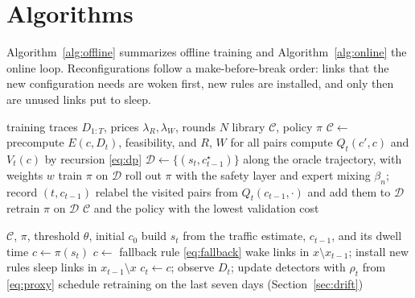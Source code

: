 \documentclass[journal]{IEEEtran}
\begin{document}
\section{Algorithms}\label{sec:algorithms}

Algorithm~\ref{alg:offline} summarizes offline training and Algorithm~\ref{alg:online} the online loop. Reconfigurations follow a make-before-break order: links that the new configuration needs are woken first, new rules are installed, and only then are unused links put to sleep.

\begin{algorithm}[t]
\caption{LiRA Offline Training}
\label{alg:offline}
\footnotesize
\begin{algorithmic}[1]
\Require training traces $D_{1:T}$, prices $\lambda_R,\lambda_W$, rounds $N$
\Ensure library $\mathcal{C}$, policy $\pi$
\State $\mathcal{C}\gets$  
\State precompute $E(c,D_t)$, feasibility, and $R$, $W$ for all pairs
\State compute $Q_t(c',c)$ and $V_t(c)$ by recursion \eqref{eq:dp}
\State $\mathcal{D}\gets\{(s_t,c^\star_{t-1})\}$ along the oracle trajectory, with weights $w$
\State train $\pi$ on $\mathcal{D}$
\State roll out $\pi$ with the safety layer and expert mixing $\beta_n$; record $(t,c_{t-1})$
\State relabel the visited pairs from $Q_t(c_{t-1},\cdot)$ and add them to $\mathcal{D}$
\State retrain $\pi$ on $\mathcal{D}$
\EndFor
\State \Return $\mathcal{C}$ and the policy with the lowest validation cost
\end{algorithmic}
\end{algorithm}

\begin{algorithm}[t]
\caption{LiRA Online Control Loop}
\label{alg:online}
\footnotesize
\begin{algorithmic}[1]
\Require $\mathcal{C}$, $\pi$, threshold $\theta$, initial $c_0$
\State build $s_t$ from the traffic estimate, $c_{t-1}$, and its dwell time
\State $c\gets\pi(s_t)$
\State $c\gets$ fallback rule \eqref{eq:fallback}
\EndIf
{}
\State wake links in $x\setminus x_{t-1}$; install new rules
\State sleep links in $x_{t-1}\setminus x$
\EndIf
\State $c_t\gets c$; observe $D_t$; update detectors with $\rho_t$ from \eqref{eq:proxy}
\State schedule retraining on the last seven days (Section~\ref{sec:drift})
\EndIf
\EndFor
\end{algorithmic}
\end{algorithm}
\end{document}
